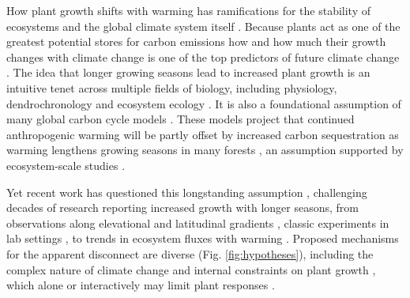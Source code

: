 \documentclass[11pt]{article}
\newcommand{\R}[1]{\label{#1}\linelabel{#1}}
\begin{document}
How plant growth shifts with warming has ramifications for the stability of ecosystems and the global climate system itself \citep{ipcc2021}. Because plants act as one of the greatest potential stores for carbon emissions how and how much their growth changes with climate change is one of the top predictors of future climate change \citep{ipcc2021,friedlingstein2022global}. The idea that longer growing seasons lead to increased plant growth is an intuitive tenet across multiple fields of biology, including physiology, dendrochronology and ecosystem ecology \citep{nobel1983biophysical,frank2022dendrochronology}. It is also a foundational assumption of many global carbon cycle models \citep[e.g.][]{ito2020global,friedlingstein2022global}. These models project that continued anthropogenic warming will be partly offset by increased carbon sequestration as warming lengthens growing seasons in many forests \citep{friedlingstein2022global}, an assumption supported by ecosystem-scale studies \citep{chen1999effects,keenan2014net,finzi2020}. 

Yet recent work has questioned this longstanding assumption \citep[e.g.][]{dow2022warm,green2022limits,silvestro2023longer}, challenging decades of research reporting increased growth with longer seasons, from observations along elevational and latitudinal gradients \citep[][]{myneni1997increased,berdanier2011growing,king2013tree,cuapio2022there}, classic experiments in lab settings \citep{went1957experimental}, to trends in ecosystem fluxes with warming \citep{chen1999effects,keenan2014net,finzi2020}. Proposed mechanisms for the apparent disconnect are diverse (Fig. \ref{fig:hypotheses}), including the complex nature of climate change \citep[e.g. drought or heat stress,][]{dow2022warm} and internal constraints on plant growth \citep{zohner2023effect}, which alone or interactively may limit plant responses \R{forbigKref1}\citep{korner2015paradigm}. %
\end{document}
